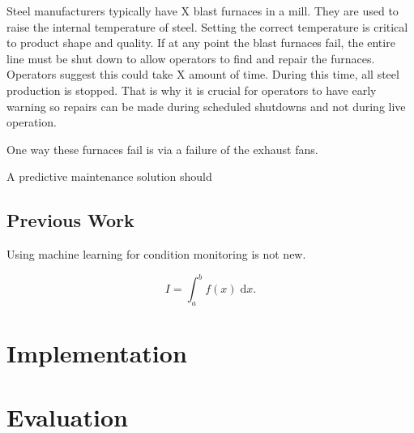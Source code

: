 \documentclass{article}
\begin{document}
Steel manufacturers typically have X blast furnaces in a mill.
They are used to raise the internal temperature of steel.
Setting the correct temperature is critical to product shape and quality.
If at any point the blast furnaces fail, the entire line must be shut down to allow operators to find and repair the furnaces.
Operators suggest this could take X amount of time.
During this time, all steel production is stopped.
That is why it is crucial for operators to have early warning so repairs can be made during scheduled shutdowns and not during live operation.

One way these furnaces fail is via a failure of the exhaust fans.


A predictive maintenance solution should 


\subsection{Previous Work}

Using machine learning for condition monitoring is not new.






\begin{equation}
	I = \int_{a}^{b} f(x) \; \text{d}x.
\end{equation}



\section{Implementation}




\section{Evaluation}




\end{document}

